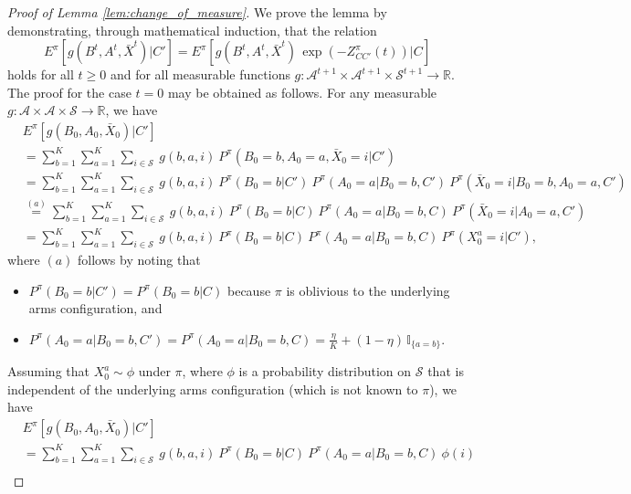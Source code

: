 \begin{proof}[Proof of Lemma \ref{lem:change_of_measure}]
	We prove the lemma by demonstrating, through mathematical induction, that the relation
	\begin{equation}
		E^\pi[g(B^t,A^t,\bar{X}^t)|C']=E^\pi[g(B^t,A^t,\bar{X}^t)\,\exp(-Z^\pi_{CC'}(t))|C]\label{eq:change_of_measure_equiv}
	\end{equation}
	holds for all $t\geq 0$ and for all measurable functions $g:\mathcal{A}^{t+1}\times\mathcal{A}^{t+1}\times\mathcal{S}^{t+1}\to\mathbb{R}$. The proof for the case $t=0$ may be obtained as follows. For any measurable $g:\mathcal{A}\times\mathcal{A}\times\mathcal{S}\to\mathbb{R}$, we have
	\begingroup \allowdisplaybreaks\begin{align}
		&E^\pi[g(B_0,A_0,\bar{X}_0)|C']\nonumber\\
		&=\sum\limits_{b=1}^K\sum\limits_{a=1}^{K}\sum\limits_{i\in\mathcal{S}}~g(b,a,i)~P^\pi(B_0=b, A_0=a,\bar{X}_0=i|C')\nonumber\\
		&=\sum\limits_{b=1}^K\sum\limits_{a=1}^{K}\sum\limits_{i\in\mathcal{S}}~g(b,a,i)~P^\pi(B_0=b|C')~P^\pi(A_0=a|B_0=b, C')~P^\pi(\bar{X}_0=i|B_0=b,A_0=a,C')\nonumber\\
		&\stackrel{(a)}{=}\sum\limits_{b=1}^K\sum\limits_{a=1}^{K}\sum\limits_{i\in\mathcal{S}}~g(b,a,i)~P^\pi(B_0=b|C)~P^\pi(A_0=a|B_0=b,C)~P^\pi(\bar{X}_0=i|A_0=a,C')\nonumber\\
		&=\sum\limits_{b=1}^K\sum\limits_{a=1}^{K}\sum\limits_{i\in\mathcal{S}}~g(b,a,i)~P^\pi(B_0=b|C)~P^\pi(A_0=a|B_0=b,C)~P^\pi(X_0^a=i|C'),\label{eq:change_of_measure_1}
	\end{align}\endgroup
	where $(a)$ follows by noting that
	\begin{itemize}
		\item $P^\pi(B_0=b|C')=P^\pi(B_0=b|C)$ because $\pi$ is oblivious to the underlying arms configuration, and
		\item $P^\pi(A_0=a|B_0=b, C')=P^\pi(A_0=a|B_0=b,C)=\frac{\eta}{K}+(1-\eta)\,\mathbb{I}_{\{a=b\}}$.	
	\end{itemize}
Assuming that $X_0^a\sim \phi$ under $\pi$, where $\phi$ is a probability distribution on $\mathcal{S}$ that is independent of the underlying arms configuration  (which is not known to $\pi$), we have
	\begingroup \allowdisplaybreaks\begin{align}
		&E^\pi[g(B_0,A_0,\bar{X}_0)|C']\nonumber\\
		&=\sum\limits_{b=1}^{K}\sum\limits_{a=1}^{K}\sum\limits_{i\in\mathcal{S}}~g(b,a,i)~P^\pi(B_0=b|C)~P^\pi(A_0=a|B_0=b,C)~\phi(i)\\

\end{align}
\end{proof}
